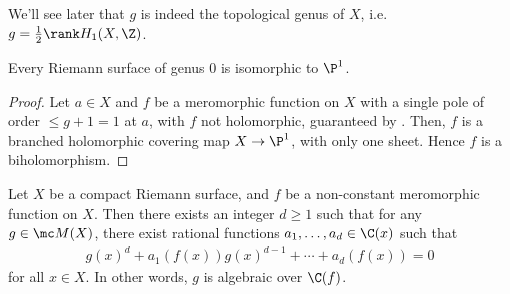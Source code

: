 \documentclass[11pt]{report}
\begin{document}
\begin{rmk}
We'll see later that $g$ is indeed the topological genus of $X$, i.e. $g= \frac{1}{2}\rank H_1(X,\Z)$.
\end{rmk}

\begin{cor}
    Every Riemann surface of genus $0$ is isomorphic to $\P^1$.
\end{cor}
\begin{proof}
Let $a \in X$ and $f$ be a meromorphic function on $X$ with a single pole of order $\leq g+1=1$ at $a$, with $f$ not holomorphic, guaranteed by . Then, $f$ is a branched holomorphic covering map $X \to \P^1$, with only one sheet. Hence $f$ is a biholomorphism.
\end{proof}

\begin{thm}[][label=thm:mer-is-algebraic]
Let $X$ be a compact Riemann surface, and $f$ be a non-constant meromorphic function on $X$. Then there exists an integer $d \geq 1$ such that for any $g \in \mc M(X)$, there exist rational functions $a_1,\dots,a_d \in \C(x)$ such that
\begin{align} \label{eq:f-is-algebraic}
    g(x)^d+a_1(f(x))g(x)^{d-1}+\cdots + a_d(f(x))=0
\end{align}
for all $x \in X$. In other words, $g$ is algebraic over $\C(f)$.
\end{thm}
\end{document}
